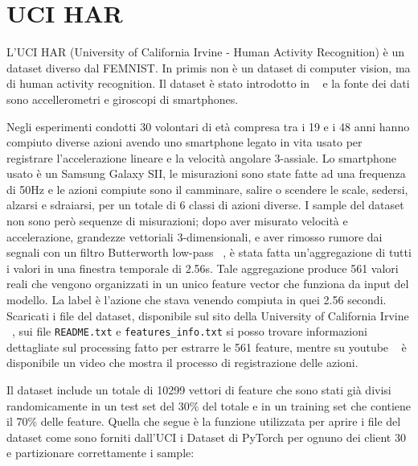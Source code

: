 \section{UCI HAR}
L'UCI HAR (University of California Irvine -
Human Activity Recognition) è un dataset diverso dal FEMNIST. In primis
non è un dataset di computer vision, ma di human activity recognition.
Il dataset è stato introdotto in ~\cite{Anguita2013APD} e la fonte dei
dati sono accellerometri e giroscopi di smartphones.

Negli esperimenti condotti 30 volontari di età compresa tra i 19 e i 48 anni
hanno compiuto diverse azioni avendo uno smartphone legato in vita 
usato per registrare l'accelerazione lineare e la velocità 
angolare 3-assiale. Lo smartphone usato è un Samsung Galaxy SII, le 
misurazioni sono state fatte ad una frequenza di 50Hz e le azioni compiute
sono il camminare, salire o scendere le scale, sedersi, alzarsi e 
sdraiarsi, per un totale di 6 classi di azioni diverse.
I sample del dataset non sono però sequenze di misurazioni; dopo 
aver misurato velocità e accelerazione, grandezze vettoriali 3-dimensionali,
e aver rimosso rumore dai segnali con un filtro Butterworth low-pass 
~\cite{butterworth_filter}, è stata fatta un'aggregazione di tutti i 
valori in una finestra temporale di 2.56s. Tale aggregazione produce 
561 valori reali che vengono organizzati in un unico feature vector 
che funziona da input del modello. La label è l'azione che stava venendo
compiuta in quei 2.56 secondi.
Scaricati i file del dataset, disponibile sul sito della 
University of California Irvine ~\cite{uci_har_ds}, sui file 
\texttt{README.txt} e \texttt{features\_info.txt}
si posso trovare informazioni dettagliate sul 
processing fatto per estrarre le 561 feature, mentre su youtube 
~\cite{har_measuring_video} è disponibile un video che mostra il 
processo di registrazione delle azioni.

Il dataset include un totale di 10299 vettori di feature che sono stati
già divisi randomicamente 
in un test set del 30\% del totale e in un training set 
che contiene il 70\% delle feature.
Quella che segue è la funzione utilizzata per aprire i file del 
dataset come sono forniti dall'UCI i Dataset di PyTorch per 
ognuno dei client 30 e partizionare correttamente i sample:


